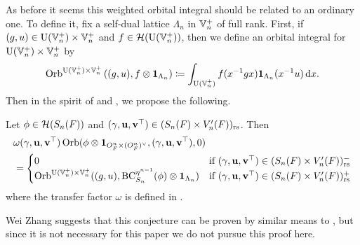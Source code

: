 As before it seems this weighted orbital integral should be related to an ordinary one.
To define it, fix a self-dual lattice $\Lambda_n$ in $\mathbb V_n^+$ of full rank.
First, if $(g,u) \in \operatorname{U}(\mathbb V_n^+) \times \mathbb V_n^+$ and $f \in \mathcal H(\operatorname{U}(\mathbb V_n^+))$,
then we define an orbital integral for $\operatorname{U}(\mathbb V_n^+) \times \mathbb V_n^+$ by
\begin{equation}
  \Orb^{\U(\VV_n^+) \times \VV_n^+}\left( (g,u), f \otimes \mathbf{1}_{\Lambda_n} \right)
  \coloneqq \int_{\U(\VV_n^+)} f(x\inv g x) \mathbf{1}_{\Lambda_n}(x^{-1} u) \odif x.
  \label{eq:unweighted_orbital_semi_lie}
\end{equation}
Then in the spirit of \cite[Conjecture 1.9]{ref:liuFJ}
and , we propose the following.
\begin{conjecture}
  \label{conj:rel_fundamental_lemma_semilie}
  Let $\phi \in \mathcal H(S_n(F))$ and ${(\gamma, \mathbf u, \mathbf v^\top)} \in (S_n(F) \times V'_n(F))_{\mathrm{rs}}$.
  Then
  \begin{align*}
    &\omega{(\gamma, \mathbf u, \mathbf v^\top)} \operatorname{Orb}(\phi \otimes \mathbf{1}_{O_F^n \times (O_F^n)^\vee}, {(\gamma, \mathbf u, \mathbf v^\top)}, 0) \\
    &=
    \begin{cases}
      0 & \text{if } {(\gamma, \mathbf u, \mathbf v^\top)} \in (S_n(F) \times V'_n(F))_{\mathrm{rs}}^- \\
      \operatorname{Orb}^{\operatorname{U}(\mathbb V_n^+) \times \mathbb V_n^+}((g,u), \operatorname{BC}^{\eta^{n-1}}_{S_n}(\phi) \otimes \mathbf{1}_{\Lambda_n})
      & \text{if } {(\gamma, \mathbf u, \mathbf v^\top)} \in (S_n(F) \times V'_n(F))_{\mathrm{rs}}^+
    \end{cases}
  \end{align*}
  where the transfer factor $\omega$ is defined in .
\end{conjecture}
Wei Zhang suggests that this conjecture can be proven by similar means
to ,
but since it is not necessary for this paper we do not pursue this proof here.

